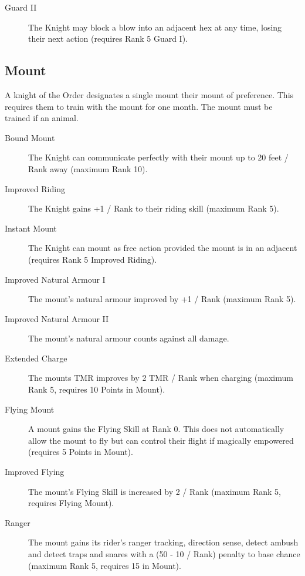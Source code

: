 \documentclass[a4paper]{article}
\begin{document}
\begin{multicols*}{3}
\begin{description}
\item[Guard II] The Knight may block a blow into an adjacent hex at
any time, losing their next action (requires Rank 5 Guard I).

\end{description}

\subsection{Mount}

A knight of the Order designates a single mount their mount of
preference.  This requires them to train with the mount for one month.
The mount must be trained if an animal.

\begin{description}

\item[Bound Mount] The Knight can communicate perfectly with their
mount up to 20 feet / Rank away (maximum Rank 10).

\item[Improved Riding] The Knight gains +1 / Rank to their riding
skill (maximum Rank 5).

\item[Instant Mount] The Knight can mount as free action provided the
mount is in an adjacent (requires Rank 5 Improved Riding).

\item[Improved Natural Armour I] The mount's natural armour improved by
+1 / Rank (maximum Rank 5).

\item[Improved Natural Armour II] The mount's natural armour counts
against all damage.

\item[Extended Charge] The mounts TMR improves by 2 TMR / Rank when
charging (maximum Rank 5, requires 10 Points in Mount).

\item[Flying Mount] A mount gains the Flying Skill at Rank 0.  This
does not automatically allow the mount to fly but can control their
flight if magically empowered (requires 5 Points in Mount).

\item[Improved Flying] The mount's Flying Skill is increased by 2 /
Rank (maximum Rank 5, requires Flying Mount).

\item[Ranger] The mount gains its rider's ranger tracking, direction
sense, detect ambush and detect traps and snares with a (50 - 10 /
Rank) penalty to base chance (maximum Rank 5, requires 15 in Mount).


\end{description}
\end{multicols*}
\end{document}
